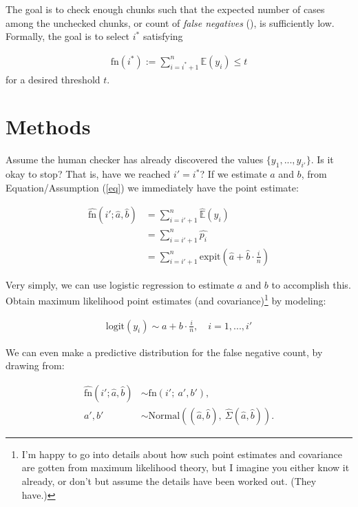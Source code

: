 \documentclass{article}
\begin{document}
The goal is to check enough chunks such that the expected number of cases among the unchecked chunks, or count of \textit{false negatives} (), is sufficiently low. Formally, the goal is to select $i^*$ satisfying

\begin{align}
\text{fn}(i^*) := \sum_{i=i^*+1}^n \mathbb{E}(y_i) \leq t
\end{align}
for a desired threshold $t$.

\newpage
\section{Methods}

Assume the human checker has already discovered the values $\{y_1, ..., y_{i'}\}$. Is it okay to stop? That is, have we reached $i'=i^*$? If we estimate $a$ and $b$, from Equation/Assumption (\ref{eq}) we immediately have the point estimate:

\begin{align}
\widehat{\text{fn}}(i'; \widehat{a}, \widehat{b}) &= \sum_{i=i'+1}^n \widehat{\mathbb{E}}(y_i) \\
&= \sum_{i=i'+1}^n  \widehat{p_i} \\
&= \sum_{i=i'+1}^n \text{expit}\left(\widehat{a}+\widehat{b}\cdot \frac{i}{n}\right)
\end{align}

Very simply, we can use logistic regression to estimate $a$ and $b$ to accomplish this. Obtain maximum likelihood point estimates (and covariance)\footnote{I'm happy to go into details about how such point estimates and covariance are gotten from maximum likelihood theory, but I imagine you either know it already, or don't but assume the details have been worked out. \newline(They have.)} by modeling:

\begin{align}
\text{logit}(y_i) \sim a + b\cdot \frac{i}{n},\quad i=1, ..., i'
\end{align}

We can even make a predictive distribution for the false negative count, by drawing from:

\begin{align}
\widehat{\text{fn}}(i'; \widehat{a}, \widehat{b}) &\sim \text{fn}(i';\ a', b'), \\
a', b' &\sim \text{Normal}\left((\widehat{a}, \widehat{b}),\ \widehat{\Sigma}(\widehat{a}, \widehat{b})\right).
\end{align}
\end{document}
